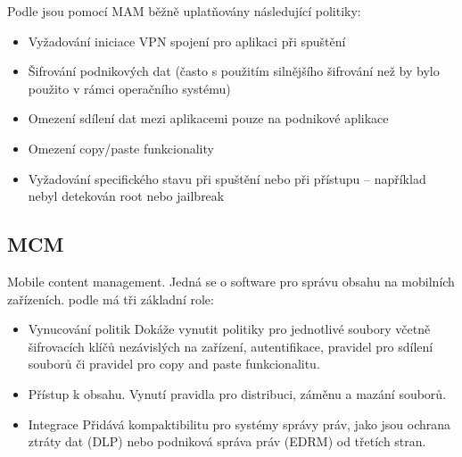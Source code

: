  Podle \cite{Gartner_EMM_2016} jsou pomocí MAM běžně uplatňovány následující politiky:
 \begin{itemize}
     \item Vyžadování iniciace VPN spojení pro aplikaci při spuštění
     \item Šifrování podnikových dat (často s použitím silnějšího šifrování než by bylo použito v rámci operačního systému)
     \item Omezení sdílení dat mezi aplikacemi pouze na podnikové aplikace
     \item Omezení copy/paste funkcionality
     \item Vyžadování specifického stavu při spuštění nebo při přístupu -- například nebyl detekován root nebo jailbreak
 \end{itemize}
 
  


\subsection{MCM} 
Mobile content management. Jedná se o software pro správu obsahu na mobilních zařízeních. podle \cite{Gartner_EMM_2016} má tři základní role:
\begin{itemize}
    \item Vynucování politik Dokáže vynutit politiky pro jednotlivé soubory včetně šifrovacích klíčů nezávislých na zařízení, autentifikace, pravidel pro sdílení souborů či pravidel pro copy and paste funkcionalitu.
    \item Přístup k obsahu. Vynutí pravidla pro distribuci, záměnu a mazání souborů.
    \item Integrace Přidává kompaktibilitu pro systémy správy práv, jako jsou ochrana ztráty dat (DLP) nebo podniková správa práv (EDRM) od třetích stran.
\end{itemize}
 

